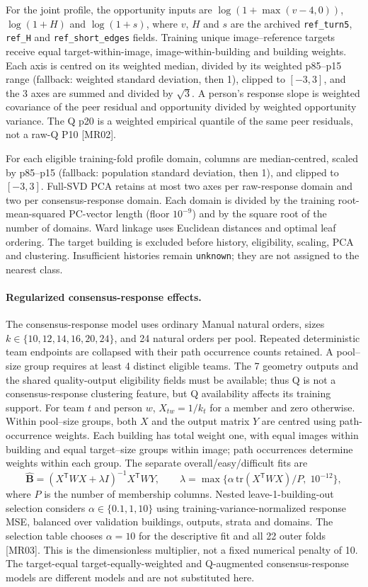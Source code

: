 For the joint profile, the opportunity inputs are
$\log(1+\max(v-4,0))$, $\log(1+H)$ and $\log(1+s)$, where
$v$, $H$ and $s$ are the archived \texttt{ref\_turn5}, \texttt{ref\_H} and
\texttt{ref\_short\_edges} fields.
Training unique image--reference targets receive equal
target-within-image, image-within-building and building weights.
Each axis is centred on its weighted median, divided by its weighted
p85--p15 range (fallback: weighted standard deviation, then 1), clipped to
$[-3,3]$, and the 3 axes are summed and divided by $\sqrt{3}$.
A person's response slope is weighted covariance of the peer residual and
opportunity divided by weighted opportunity variance. The Q p20 is a weighted
empirical quantile of the same peer residuals, not a raw-Q P10 [MR02].

For each eligible training-fold profile domain, columns are median-centred,
scaled by p85--p15 (fallback: population standard deviation, then 1), and
clipped to $[-3,3]$. Full-SVD PCA retains at most two axes per raw-response
domain and two per consensus-response domain. Each domain is divided by
the training root-mean-squared PC-vector length (floor $10^{-9}$) and by
the square root of the number of domains. Ward linkage uses Euclidean
distances and optimal leaf ordering. The target building is excluded before
history, eligibility, scaling, PCA and clustering. Insufficient histories
remain \texttt{unknown}; they are not assigned to the nearest class.

\paragraph{Regularized consensus-response effects.}
The consensus-response model uses ordinary Manual natural
orders, sizes $k\in\{10,12,14,16,20,24\}$, and 24 natural orders per pool.
Repeated deterministic team endpoints are collapsed with their path
occurrence counts retained. A pool--size group requires at least 4
distinct eligible teams. The 7 geometry outputs and the shared
quality-output eligibility fields must be available; thus Q is not a
consensus-response clustering feature, but Q availability affects its training support.
For team $t$ and person $w$, $X_{tw}=1/k_t$ for a member and zero otherwise.
Within pool--size groups, both $X$ and the output matrix $Y$ are centred
using path-occurrence weights. Each building has total weight one, with
equal images within building and equal target--size groups within image;
path occurrences determine weights within each group. The separate
overall/easy/difficult fits are
\[
 \widehat{\mathbf B}
 = (X^\mathsf{T}WX+\lambda I)^{-1}X^\mathsf{T}WY,\qquad
 \lambda=\max\{ \alpha\,\mathrm{tr}(X^\mathsf{T}WX)/P,\;10^{-12}\},
\]
where $P$ is the number of membership columns.
Nested leave-1-building-out selection considers
$\alpha\in\{0.1,1,10\}$ using training-variance-normalized response MSE,
balanced over validation buildings, outputs, strata and domains.
The selection table chooses $\alpha=10$ for the descriptive fit
and all 22 outer folds [MR03]. This is the dimensionless multiplier, not
a fixed numerical penalty of 10. The target-equal
target-equally-weighted and Q-augmented consensus-response models are
different models and are not substituted here.

